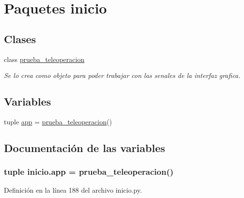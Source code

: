 \hypertarget{namespaceinicio}{
\section{Paquetes inicio}
\label{namespaceinicio}
}
\subsection*{Clases}
\begin{DoxyCompactItemize}
\item 
class \hyperlink{classinicio_1_1prueba__teleoperacion}{prueba\_\-teleoperacion}
\begin{DoxyCompactList}\small\item\em Se lo crea como objeto para poder trabajar con las senales de la interfaz grafica. \end{DoxyCompactList}\end{DoxyCompactItemize}
\subsection*{Variables}
\begin{DoxyCompactItemize}
\item 
tuple \hyperlink{namespaceinicio_a3d259595825f914437642eb35265f3ad}{app} = \hyperlink{classinicio_1_1prueba__teleoperacion}{prueba\_\-teleoperacion}()
\end{DoxyCompactItemize}


\subsection{Documentación de las variables}
\hypertarget{namespaceinicio_a3d259595825f914437642eb35265f3ad}{
\subsubsection[{app}]{\setlength{\rightskip}{0pt plus 5cm}tuple {\bf inicio.app} = {\bf prueba\_\-teleoperacion}()}}
\label{namespaceinicio_a3d259595825f914437642eb35265f3ad}


Definición en la línea 188 del archivo inicio.py.

